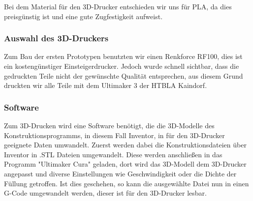 \begin{table}[H]
\centering
{}
    \caption{Vergleich der 3D-Druck Materialien}
\end{table}

Bei dem Material für den 3D-Drucker entschieden wir uns für PLA, da dies preisgünstig ist und eine gute Zugfestigkeit aufweist.

\subsubsection{Auswahl des 3D-Druckers}
Zum Bau der ersten Prototypen benutzten wir einen Renkforce RF100, dies ist ein kostengünstiger Einsteigerdrucker.
Jedoch wurde schnell sichtbar, dass die gedruckten Teile nicht der gewünschte Qualität entsprechen, aus diesem Grund
druckten wir alle Teile mit dem Ultimaker 3 der HTBLA Kaindorf.

\subsubsection{Software}
Zum 3D-Drucken wird eine Software benötigt, die die 3D-Modelle des Konstruktionsprogramms, in diesem Fall Inventor,
in für den 3D-Drucker geeignete Daten umwandelt.
Zuerst werden dabei die Konstruktionsdateien über Inventor in .STL Dateien umgewandelt. Diese werden anschließen in das
Programm "Ultimaker Cura" geladen, dort wird das 3D-Modell dem 3D-Drucker angepasst und diverse Einstellungen wie
Geschwindigkeit oder die Dichte der Füllung getroffen. Ist dies geschehen, so kann die ausgewählte Datei nun in einen
G-Code umgewandelt werden, dieser ist für den 3D-Drucker lesbar.

